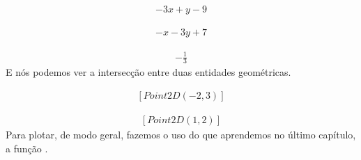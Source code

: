 \documentclass[letterpaper,10pt,english]{jupyterBook}
\begin{document}
\begin{sphinxVerbatim}[commandchars=\\\{\}]
     
\end{sphinxVerbatim}
\begin{equation*}
\begin{split}\displaystyle - 3 x + y - 9\end{split}
\end{equation*}
\begin{sphinxVerbatim}[commandchars=\\\{\}]
   
\end{sphinxVerbatim}
\begin{equation*}
\begin{split}\displaystyle - x - 3 y + 7\end{split}
\end{equation*}
\begin{sphinxVerbatim}[commandchars=\\\{\}]
 
\end{sphinxVerbatim}
\begin{equation*}
\begin{split}\displaystyle - \frac{1}{3}\end{split}
\end{equation*}
\sphinxAtStartPar
E nós podemos ver a intersecção entre duas entidades geométricas.

\begin{sphinxVerbatim}[commandchars=\\\{\}]
\end{sphinxVerbatim}
\begin{equation*}
\begin{split}\displaystyle \left[ Point2D\left(-2, 3\right)\right]\end{split}
\end{equation*}
\begin{sphinxVerbatim}[commandchars=\\\{\}]
  
\end{sphinxVerbatim}
\begin{equation*}
\begin{split}\displaystyle \left[ Point2D\left(1, 2\right)\right]\end{split}
\end{equation*}
\sphinxAtStartPar
Para plotar, de modo geral, fazemos o uso do que aprendemos no último capítulo, a função .
\end{document}
